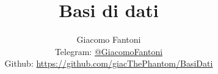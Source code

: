 
\title{\Huge \textbf{Basi di dati}}
\author{
  Giacomo Fantoni \\
  \small Telegram: \href{https://t.me/GiacomoFantoni}{@GiacomoFantoni} \\[3pt]
  \small Github: \href{https://github.com/giacThePhantom/BasiDati}{https://github.com/giacThePhantom/BasiDati}}

\maketitle
\tableofcontents










